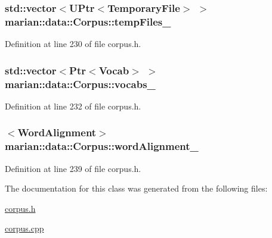 \subsubsection[{\texorpdfstring{temp\+Files\+\_\+}{tempFiles_}}]{\setlength{\rightskip}{0pt plus 5cm}std\+::vector$<${\bf U\+Ptr}$<${\bf Temporary\+File}$>$ $>$ marian\+::data\+::\+Corpus\+::temp\+Files\+\_\+\hspace{0.3cm}{\ttfamily [private]}}\hypertarget{classmarian_1_1data_1_1Corpus_aa01a09870346c79a900f8938ad1f3be7}{}\label{classmarian_1_1data_1_1Corpus_aa01a09870346c79a900f8938ad1f3be7}


Definition at line 230 of file corpus.\+h.

\subsubsection[{\texorpdfstring{vocabs\+\_\+}{vocabs_}}]{\setlength{\rightskip}{0pt plus 5cm}std\+::vector$<${\bf Ptr}$<${\bf Vocab}$>$ $>$ marian\+::data\+::\+Corpus\+::vocabs\+\_\+\hspace{0.3cm}{\ttfamily [private]}}\hypertarget{classmarian_1_1data_1_1Corpus_a25b11761814f5a8f383d1b8d81bcc869}{}\label{classmarian_1_1data_1_1Corpus_a25b11761814f5a8f383d1b8d81bcc869}


Definition at line 232 of file corpus.\+h.

\subsubsection[{\texorpdfstring{word\+Alignment\+\_\+}{wordAlignment_}}]{$<${\bf Word\+Alignment}$>$ marian\+::data\+::\+Corpus\+::word\+Alignment\+\_\+\hspace{0.3cm}{\ttfamily [private]}}\hypertarget{classmarian_1_1data_1_1Corpus_ad6beb16ba8ae3d8fcd2efb1927b42016}{}\label{classmarian_1_1data_1_1Corpus_ad6beb16ba8ae3d8fcd2efb1927b42016}


Definition at line 239 of file corpus.\+h.



The documentation for this class was generated from the following files\+:\begin{DoxyCompactItemize}
\item 
\hyperlink{corpus_8h}{corpus.\+h}\item 
\hyperlink{corpus_8cpp}{corpus.\+cpp}\end{DoxyCompactItemize}
